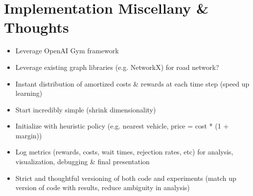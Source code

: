\documentclass[12pt]{article}
\begin{document}
\section*{Implementation Miscellany \& Thoughts}
\begin{itemize}
		\item Leverage OpenAI Gym framework
		\item Leverage existing graph libraries (e.g. NetworkX) for road network?
		\item Instant distribution of amortized costs \& rewards at each time step (speed up learning)
		\item Start incredibly simple (shrink dimensionality)
		\item Initialize with heuristic policy (e.g. nearest vehicle, price = cost * (1 + margin))
		\item Log metrics (rewards, costs, wait times, rejection rates, etc) for analysis,
				visualization, debugging \& final presentation
		\item Strict and thoughtful versioning of both code and experiments (match up version
				of code with results, reduce ambiguity in analysis)
\end{itemize}
\end{document}
